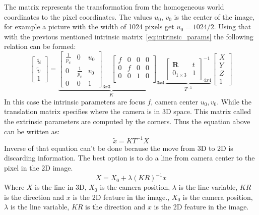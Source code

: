 The matrix represents the transformation from the homogeneous world coordinates to the pixel coordinates.
The values $u_0$, $v_0$ is the center of the image, for example a picture with the width of 1024 pixels get $u_0 = 1024/2$.
Using that with the previous mentioned intrinsic matrix~\ref{eq:intrinsic_params} the following relation can be formed:
\begin{equation}\label{eq:camera_transfer}
    \begin{bmatrix}
        \tilde{u} \\ \tilde{v} \\ 1
    \end{bmatrix} =
    \underbrace{
        \begin{bmatrix}
            \frac{1}{p_u} & 0 & u_0\\
            0 & \frac{1}{p_v} & v_0\\
            0 & 0 & 1
        \end{bmatrix}_{3x3}
        \begin{bmatrix}
            f & 0 & 0 & 0\\
            0 & f & 0 & 0\\
            0 & 0 & 1 & 0\\
        \end{bmatrix}_{3x4}
    }_K
    \underbrace{
        \begin{bmatrix}
            \mathbf{R} & t \\
            0_{1\times 3} & 1
        \end{bmatrix}^{-1}_{4x4}
    }_{T^{-1}}
    \begin{bmatrix}
        X \\ Y \\ Z \\ 1
    \end{bmatrix}
\end{equation}
In this case the intrinsic parameters are focus $f$, camera center $u_0,v_0$.
While the translation matrix specifies where the camera is in 3D space.
This matrix called the extrinsic parameters are computed by the \aruco corners.
Thus the equation above can be written as:
\begin{equation}
    \tilde{x}  = KT^{-1}X
\end{equation}
Inverse of that equation can't be done because the move from 3D to 2D is discarding information.
The best option is to do a line from camera center to the pixel in the 2D image.
\begin{equation}
    X = X_0 + \lambda(KR)^{-1}  x
\end{equation}
Where $X$ is the line in 3D, $X_0$ is the camera position, $\lambda$ is the line variable, $KR$ is the direction and $x$ is the 2D feature in the image., $X_0$ is the camera position, $\lambda$ is the line variable, $KR$ is the direction and $x$ is the 2D feature in the image.



